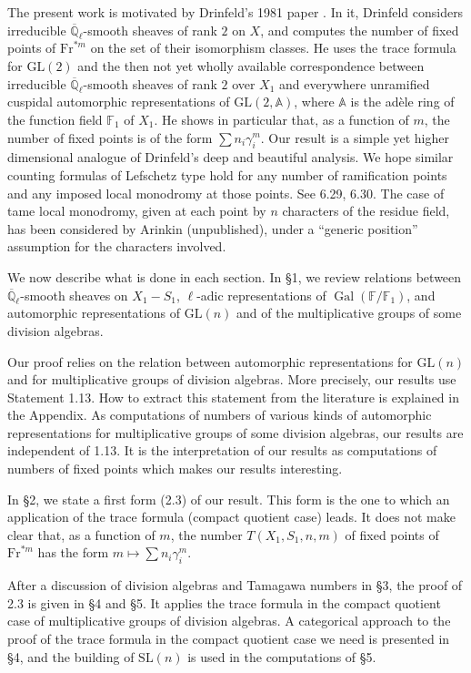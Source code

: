 \documentclass[11pt,a4paper]{article}
\theoremstyle{plain}
\theoremstyle{definition}
\DeclareMathOperator{\Gal}{Gal}
\newcommand{\Ql}{\overline{\mathbb{Q}}_\ell}
\newcommand{\F}{\mathbb{F}}
\newcommand{\GL}{\mathrm{GL}}
\newcommand{\SL}{\mathrm{SL}}
\newcommand{\Fr}{\mathrm{Fr}}
\begin{document}
The present work is motivated by Drinfeld's 1981 paper \cite{D}. In it, Drinfeld considers irreducible $\Ql$-smooth sheaves of rank $2$ on $X$, and computes the number of fixed points of $\Fr^{*m}$ on the set of their isomorphism classes. He uses the trace formula for $\GL(2)$ and the then not yet wholly available correspondence between irreducible $\Ql$-smooth sheaves of rank $2$ over $X_1$ and everywhere unramified cuspidal automorphic representations of $\GL(2,\mathbb{A})$, where $\mathbb{A}$ is the ad\`ele ring of the function field $\mathbb{F}_1$ of $X_1$. He shows in particular that, as a function of $m$, the number of fixed points is of the form $\sum n_i \gamma_i^m$. Our result is a simple yet higher dimensional analogue of Drinfeld's deep and beautiful analysis. We hope similar counting formulas of Lefschetz type hold for any number of ramification points and any imposed local monodromy at those points. See 6.29, 6.30. The case of tame local monodromy, given at each point by $n$ characters of the residue field, has been considered by Arinkin (unpublished), under a ``generic position'' assumption for the characters involved.

We now describe what is done in each section. In \S 1, we review relations between $\Ql$-smooth sheaves on $X_1 - S_1$, $\ell$-adic representations of $\Gal(\F/\mathbb{F}_1)$, and automorphic representations of $\GL(n)$ and of the multiplicative groups of some division algebras.

Our proof relies on the relation between automorphic representations for $\GL(n)$ and for multiplicative groups of division algebras. More precisely, our results use Statement 1.13. How to extract this statement from the literature is explained in the Appendix. As computations of numbers of various kinds of automorphic representations for multiplicative groups of some division algebras, our results are independent of 1.13. It is the interpretation of our results as computations of numbers of fixed points which makes our results interesting.

In \S 2, we state a first form (2.3) of our result. This form is the one to which an application of the trace formula (compact quotient case) leads. It does not make clear that, as a function of $m$, the number $T(X_1,S_1,n,m)$ of fixed points of $\Fr^{*m}$ has the form $m \mapsto \sum n_i \gamma_i^m$.

After a discussion of division algebras and Tamagawa numbers in \S 3, the proof of 2.3 is given in \S 4 and \S 5. It applies the trace formula in the compact quotient case of multiplicative groups of division algebras. A categorical approach to the proof of the trace formula in the compact quotient case we need is presented in \S 4, and the building of $\SL(n)$ is used in the computations of \S 5.
\end{document}
